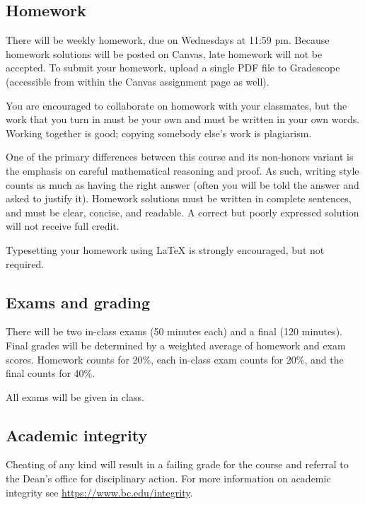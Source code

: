 \documentclass[11pt,oneside]{amsart}
\begin{document}
\subsection*{Homework}
There will be weekly homework, due on Wednesdays at 11:59 pm. Because homework solutions will be posted on Canvas, late homework will not be accepted. To submit your homework, upload a single PDF file to Gradescope (accessible from within the Canvas assignment page as well).

You are encouraged to collaborate on homework with your classmates, but the work that you turn in must be your own and must be written in your own words.  Working together is good; copying somebody else’s work is plagiarism.

One of the primary differences between this course and its non-honors variant is the emphasis on careful mathematical reasoning and proof.  As such, writing style counts as much as having the right answer (often you will be told the answer and asked to justify it).  Homework solutions must be written in complete sentences, and must be clear, concise, and readable.  A correct but poorly expressed solution will not receive full credit.

Typesetting your homework using LaTeX is strongly encouraged, but not required.

\subsection*{Exams and grading}
There will be two in-class exams (50 minutes each) and a final (120 minutes). Final grades will be determined by a weighted average of homework and exam scores.  Homework counts for 20\%, each in-class exam counts for 20\%, and the final counts for 40\%.

All exams will be given in class.

\subsection*{Academic integrity}
Cheating of any kind will result in a failing grade for the course and referral to the Dean’s office for disciplinary action.  For more information on academic integrity see \url{https://www.bc.edu/integrity}.
\end{document}
